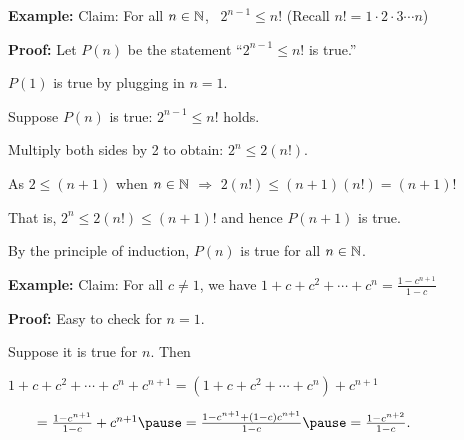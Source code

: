 \documentclass[10pt,aspectratio=169]{beamer}
\begin{document}
\begin{frame}
\textbf{Example:}
Claim: For all $n \in {\mathbb{N}}$, ~$2^{n-1} \leq n!$  \quad (Recall $n! = 1 \cdot 2 \cdot 3 \cdots n$)

\medskip
\pause

\textbf{Proof:}
Let $P(n)$ be the statement ``$2^{n-1} \leq n!$ is true.''

\pause

$P(1)$ is true by plugging in $n=1$.

\pause

Suppose $P(n)$ is true: $2^{n-1} \leq n!$ holds.

\pause
Multiply both sides by 2 to obtain:
$2^n \leq 2(n!)$.

\pause
As $2 \leq (n+1)$ when $n \in {\mathbb{N}}$ \quad $\Rightarrow$ \quad $2(n!) \leq (n+1)(n!) = (n+1)!$

\pause
That is, $2^n \leq 2(n!) \leq  (n+1)!$ and hence $P(n+1)$ is true.

\pause
By the principle of induction, $P(n)$
is true for all $n \in {\mathbb{N}}$.

\medskip
\pause

\textbf{Example:}
Claim: For all $c \not= 1$, we have $1 + c + c^2 + \cdots + c^n = \frac{1-c^{n+1}}{1-c}$

\medskip
\pause

\textbf{Proof:}
Easy to check for $n=1$.

\pause
Suppose it is true for $n$.  Then

\pause
\medskip
$
1 + c + c^2 + \cdots + c^n + c^{n+1}  =
( 1 + c + c^2 + \cdots + c^n ) + c^{n+1}
$

\pause
\medskip
$\qquad = \frac{1-c^{n+1}}{1-c}  + c^{n+1}
\pause
= \frac{1-c^{n+1}  + (1-c)c^{n+1}}{1-c}
\pause
= \frac{1-c^{n+2}}{1-c} .$
\end{frame}

%
%
%
%
\end{document}
